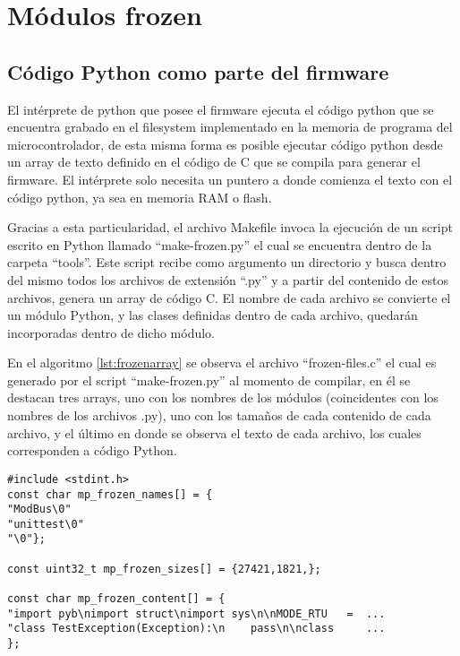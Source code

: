 
\chapter{Módulos frozen} %

\label{AppendixB} %

\section{Código Python como parte del firmware}

El intérprete de python que posee el firmware ejecuta el código python que se encuentra grabado en el filesystem implementado en la memoria de programa del microcontrolador, de esta misma forma es posible ejecutar código python desde un array de texto definido en el código de C que se compila para generar el firmware. El intérprete solo necesita un puntero a donde comienza el texto con el código python, ya sea en memoria RAM o flash.

Gracias a esta particularidad, el archivo Makefile invoca la ejecución de un script escrito en Python llamado “make-frozen.py” el cual se encuentra dentro de la carpeta “tools”. Este script recibe como argumento un directorio y busca dentro del mismo todos los archivos de extensión “.py” y a partir del contenido de estos archivos, genera un array de código C. El nombre de cada archivo se convierte el un módulo Python, y las clases definidas dentro de cada archivo, quedarán incorporadas dentro de dicho módulo.

En el algoritmo \ref{lst:frozenarray} se observa el archivo “frozen-files.c” el cual es generado por el script “make-frozen.py” al momento de compilar, en él se destacan tres arrays, uno con los nombres de los módulos (coincidentes con los nombres de los archivos .py), uno con los tamaños de cada contenido de cada archivo, y el último en donde se observa el texto de cada archivo, los cuales corresponden a código Python. 

\begin{lstlisting}[label={lst:frozenarray},caption=Array de texto generado por el script make-frozen.] 
#include <stdint.h>
const char mp_frozen_names[] = {
"ModBus\0"
"unittest\0"
"\0"};

const uint32_t mp_frozen_sizes[] = {27421,1821,};

const char mp_frozen_content[] = {
"import pyb\nimport struct\nimport sys\n\nMODE_RTU   =  ...
"class TestException(Exception):\n    pass\n\nclass     ...  
};
\end{lstlisting}

